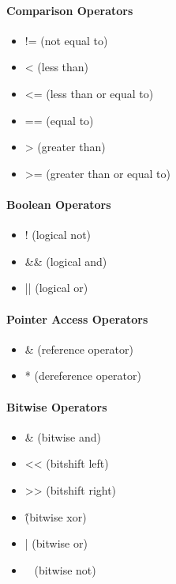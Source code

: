 \documentclass[../informe_krapp.tex]{subfiles}
\begin{document}
\begin{multicols}{2}
	\paragraph{Comparison Operators}
	\begin{itemize}
		\item != (not equal to)
		\item < (less than)
		\item <= (less than or equal to)
		\item == (equal to)
		\item > (greater than)
		\item >= (greater than or equal to)
	\end{itemize}

	\paragraph{Boolean Operators}
	\begin{itemize}
		\item ! (logical not)
		\item \&\& (logical and)
		\item || (logical or)
	\end{itemize}

	\paragraph{Pointer Access Operators}
	\begin{itemize}
		\item \& (reference operator)
		\item * (dereference operator)
	\end{itemize}

	\paragraph{Bitwise Operators}
	\begin{itemize}
		\item \& (bitwise and)
		\item << (bitshift left)
		\item >> (bitshift right)
		\item \^ (bitwise xor)
		\item | (bitwise or)
		\item ~ (bitwise not)
	\end{itemize}


\end{multicols}
\end{document}
